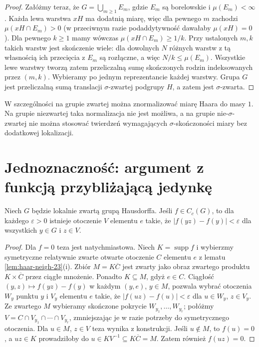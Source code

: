 \begin{proof}
Załóżmy teraz, że $G=\bigcup_{m\ge1}E_m$,
gdzie $E_m$ są borelowskie i $\mu(E_m)<\infty$.
Każda lewa warstwa $xH$ ma dodatnią miarę,
więc dla pewnego $m$ zachodzi
$\mu(xH\cap E_m)>0$ (w przeciwnym razie
podaddytywność dawałaby $\mu(xH)=0$).
Dla pewnego $k\ge1$ mamy wówczas
$\mu(xH\cap E_m)\ge 1/k$.
Przy ustalonych $m,k$ takich warstw jest
skończenie wiele: dla dowolnych $N$ różnych
warstw z tą własnością ich przecięcia z $E_m$
są rozłączne, a więc $N/k\le\mu(E_m)$.
Wszystkie lewe warstwy tworzą zatem przeliczalną
sumę skończonych rodzin indeksowanych przez
$(m,k)$. Wybieramy po jednym reprezentancie
każdej warstwy. Grupa $G$ jest przeliczalną
sumą translacji $\sigma$-zwartej podgrupy $H$,
a zatem jest $\sigma$-zwarta.
\end{proof}

W szczególności na grupie zwartej można
znormalizować miarę Haara do masy $1$.
Na grupie niezwartej taka normalizacja nie jest
możliwa, a na grupie nie-$\sigma$-zwartej nie
można stosować twierdzeń wymagających
$\sigma$-skończoności miary bez dodatkowej lokalizacji.

\section{Jednoznaczność: argument z funkcją przybliżającą jedynkę}
\begin{lemat}
\label{lem:haar-uniform-23}
Niech $G$ będzie lokalnie zwartą grupą Hausdorffa.
Jeśli $f\in C_c(G)$, to dla każdego $\varepsilon>0$
istnieje otoczenie $V$ elementu $e$ takie, że
$|f(yz)-f(y)|<\varepsilon$ dla wszystkich
$y\in G$ i $z\in V$.
\end{lemat}
\begin{proof}
Dla $f=0$ teza jest natychmiastowa. Niech
$K=\operatorname{supp}f$ i wybierzmy symetryczne
relatywnie zwarte otwarte otoczenie $C$ elementu $e$
z lematu \ref{lem:haar-neigh-23}(i).
Zbiór $M=K\overline C$ jest zwarty jako obraz
zwartego produktu $K\times\overline C$ przez ciągłe
mnożenie. Ponadto $K\subseteq M$, gdyż $e\in C$. Ciągłość
$(y,z)\mapsto f(yz)-f(y)$ w każdym $(y,e)$,
$y\in M$, pozwala wybrać otoczenia $W_y$ punktu $y$
i $V_y$ elementu $e$ takie, że
$|f(uz)-f(u)|<\varepsilon$ dla $u\in W_y$, $z\in V_y$.
Ze zwartego $M$ wybieramy skończone pokrycie
$W_{y_1},\dots,W_{y_r}$; połóżmy
$V=C\cap V_{y_1}\cap\cdots\cap V_{y_r}$,
zmniejszając je w razie potrzeby do symetrycznego
otoczenia. Dla $u\in M$, $z\in V$ teza wynika
z konstrukcji. Jeśli $u\notin M$, to $f(u)=0$,
a $uz\in K$ prowadziłoby do
$u\in K V^{-1}\subseteq K\overline C=M$.
Zatem również $f(uz)=0$.
\end{proof}

